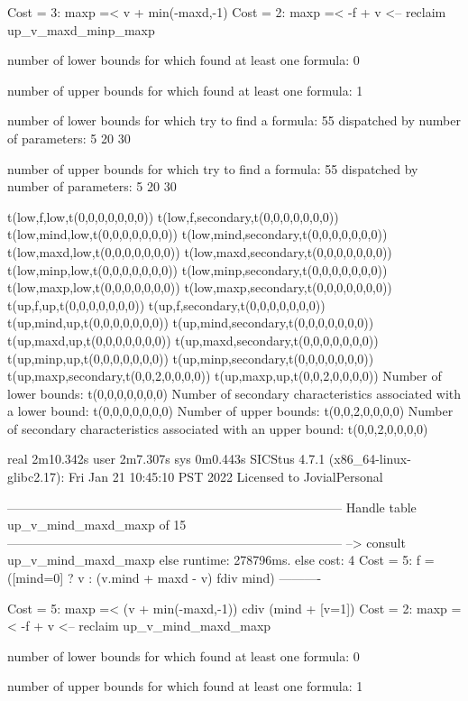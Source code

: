 Cost =  3:  maxp =< v + min(-maxd,-1) %
Cost =  2:  maxp =< -f + v
<-- reclaim up_v_maxd_minp_maxp

number of lower bounds for which found at least one formula: 0

number of upper bounds for which found at least one formula: 1

number of lower bounds for which try to find a formula: 55
dispatched by number of parameters: 5  20  30

number of upper bounds for which try to find a formula: 55
dispatched by number of parameters: 5  20  30

t(low,f,low,t(0,0,0,0,0,0,0))
t(low,f,secondary,t(0,0,0,0,0,0,0))
t(low,mind,low,t(0,0,0,0,0,0,0))
t(low,mind,secondary,t(0,0,0,0,0,0,0))
t(low,maxd,low,t(0,0,0,0,0,0,0))
t(low,maxd,secondary,t(0,0,0,0,0,0,0))
t(low,minp,low,t(0,0,0,0,0,0,0))
t(low,minp,secondary,t(0,0,0,0,0,0,0))
t(low,maxp,low,t(0,0,0,0,0,0,0))
t(low,maxp,secondary,t(0,0,0,0,0,0,0))
t(up,f,up,t(0,0,0,0,0,0,0))
t(up,f,secondary,t(0,0,0,0,0,0,0))
t(up,mind,up,t(0,0,0,0,0,0,0))
t(up,mind,secondary,t(0,0,0,0,0,0,0))
t(up,maxd,up,t(0,0,0,0,0,0,0))
t(up,maxd,secondary,t(0,0,0,0,0,0,0))
t(up,minp,up,t(0,0,0,0,0,0,0))
t(up,minp,secondary,t(0,0,0,0,0,0,0))
t(up,maxp,secondary,t(0,0,2,0,0,0,0))
t(up,maxp,up,t(0,0,2,0,0,0,0))
Number of lower bounds:                                             t(0,0,0,0,0,0,0)
Number of secondary characteristics associated with a lower bound:  t(0,0,0,0,0,0,0)
Number of upper bounds:                                             t(0,0,2,0,0,0,0)
Number of secondary characteristics associated with an upper bound: t(0,0,2,0,0,0,0)

real	2m10.342s
user	2m7.307s
sys	0m0.443s
SICStus 4.7.1 (x86_64-linux-glibc2.17): Fri Jan 21 10:45:10 PST 2022
Licensed to JovialPersonal


--------------------------------------------------------------------------------
Handle table up_v_mind_maxd_maxp of 15
--------------------------------------------------------------------------------
--> consult up_v_mind_maxd_maxp
else runtime: 278796ms. else cost: 4
Cost =  5:  f = ([mind=0] ? v : (v.mind + maxd - v) fdiv mind) %
----------

Cost =  5:  maxp =< (v + min(-maxd,-1)) cdiv (mind + [v=1]) %
Cost =  2:  maxp =< -f + v
<-- reclaim up_v_mind_maxd_maxp

number of lower bounds for which found at least one formula: 0

number of upper bounds for which found at least one formula: 1

